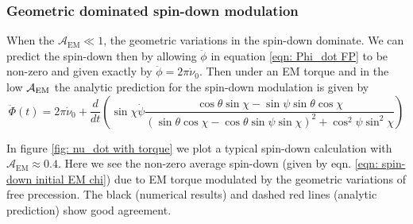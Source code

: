 \documentclass[/home/greg/Thesis/main/main.tex]{subfiles}
\begin{document}
\subsubsection{Geometric dominated spin-down modulation}
When the $\mathcal{A}_{\mathrm{EM}} \ll 1$, the geometric variations
in the spin-down dominate. We can predict the spin-down then by allowing 
$\ddot{\phi}$ in equation \eqref{eqn: Phi_dot FP} to be non-zero and given
exactly by $\ddot{\phi} = 2\pi \dot{\nu}_{0}$. Then under an EM torque and 
in the low $\mathcal{A}_{\mathrm{EM}}$ the analytic prediction for the spin-down modulation is
given by 
\begin{equation}
    \ddot{\Phi}(t) = 2\pi \dot{\nu}_{0} + \frac{d}{dt}\left(
        \sin\chi\dot{\psi} \frac{\cos\theta\sin\chi - \sin \psi \sin \theta \cos\chi 
}{(\sin\theta \cos \chi - \cos \theta \sin \psi \sin \chi)^{2} + \cos^{2}\psi \sin^{2} \chi}
\right)
\label{eqn: 1238}
\end{equation}

In figure \ref{fig: nu_dot with torque} we plot a typical spin-down calculation
with $\mathcal{A}_{\mathrm{EM}} \approx 0.4$. Here we see  
the non-zero average spin-down (given by eqn. \eqref{eqn: spin-down initial EM chi})
due to EM torque modulated by the geometric variations of free precession. The
black (numerical results) and dashed red lines (analytic prediction) show good agreement.
\begin{figure}[htb]
\begin{floatrow}
\capbtabbox{%
  
}{%
  \caption{}%
  \label{tab:}
}
\end{floatrow}
\end{figure}

\FloatBarrier
\end{document}

